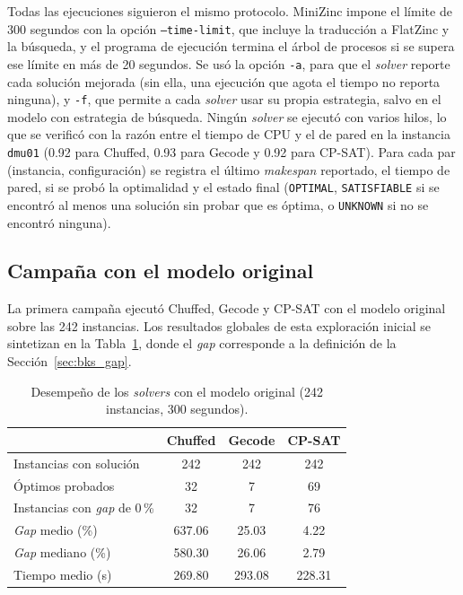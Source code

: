 Todas las ejecuciones siguieron el mismo protocolo. MiniZinc impone el límite
de 300 segundos con la opción \texttt{--time-limit}, que incluye la traducción a
FlatZinc y la búsqueda, y el programa de ejecución termina el árbol de procesos
si se supera ese límite en más de 20 segundos. Se usó la opción \texttt{-a},
para que el \textit{solver} reporte cada solución mejorada (sin ella, una
ejecución que agota el tiempo no reporta ninguna), y \texttt{-f}, que permite a
cada \textit{solver} usar su propia estrategia, salvo en el modelo con
estrategia de búsqueda. Ningún \textit{solver} se ejecutó con varios hilos, lo
que se verificó con la razón entre el tiempo de CPU y el de pared en la
instancia \texttt{dmu01} (0.92 para Chuffed, 0.93 para Gecode y 0.92 para
CP-SAT). Para cada par (instancia, configuración) se registra el último
\textit{makespan} reportado, el tiempo de pared, si se probó la optimalidad y
el estado final (\texttt{OPTIMAL}, \texttt{SATISFIABLE} si se encontró al
menos una solución sin probar que es óptima, o \texttt{UNKNOWN} si no se
encontró ninguna).

\subsection{Campaña con el modelo original}

La primera campaña ejecutó Chuffed, Gecode y CP-SAT con el modelo original
sobre las 242 instancias. Los resultados globales de esta exploración inicial
se sintetizan en la Tabla~\ref{tab:desempeno_300}, donde el \textit{gap}
corresponde a la definición de la Sección~\ref{sec:bks_gap}.

\begin{table}[H]
  \centering
  \small
  \singlespacing
  \caption{Desempeño de los \textit{solvers} con el modelo original
  (242 instancias, 300 segundos).}
  \label{tab:desempeno_300}
  \begin{tabular}{l c c c}
    \toprule
    & \textbf{Chuffed} & \textbf{Gecode} & \textbf{CP-SAT} \\
    \midrule
    Instancias con solución             & 242     & 242    & 242 \\
    Óptimos probados                     & 32      & 7      & 69 \\
    Instancias con \textit{gap} de 0\,\% & 32      & 7      & 76 \\
    \textit{Gap} medio (\%)              & 637.06  & 25.03  & 4.22 \\
    \textit{Gap} mediano (\%)            & 580.30  & 26.06  & 2.79 \\
    Tiempo medio (s)                     & 269.80  & 293.08 & 228.31 \\
    \bottomrule
  \end{tabular}
  \par{}
\end{table}

